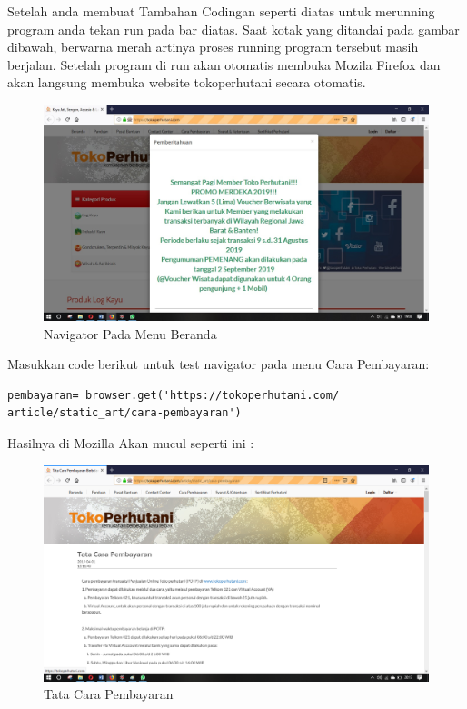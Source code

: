 Setelah anda membuat Tambahan Codingan  seperti diatas untuk merunning program anda tekan run pada bar diatas. Saat kotak yang ditandai pada gambar dibawah, berwarna merah artinya proses running program tersebut masih berjalan. Setelah program di run akan otomatis membuka Mozila Firefox dan akan langsung membuka website tokoperhutani secara otomatis.

\begin{figure}[ht!]
	\centering
	\includegraphics[scale=0.3]{figures/1x}
	\caption{Navigator Pada Menu Beranda}
\end{figure}

Masukkan code berikut untuk test navigator pada menu Cara Pembayaran:

\begin{verbatim}
pembayaran= browser.get('https://tokoperhutani.com/
article/static_art/cara-pembayaran')
\end{verbatim}

Hasilnya  di Mozilla Akan mucul seperti ini :
\begin{figure}[h]
	\centering
	\includegraphics[scale=0.3]{figures/2}
	\caption{Tata Cara Pembayaran}
\end{figure}

